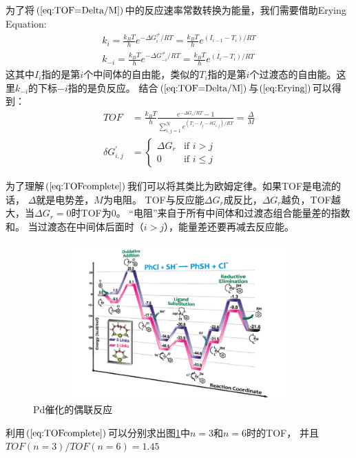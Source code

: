 \documentclass[a4paper,titlepage]{article}
\begin{document}
为了将$(\ref{eq:TOF=Delta/M})$中的反应速率常数转换为能量，我们需要借助Erying Equation:
\begin{equation}\label{eq:Erying}
\begin{split}
k_i = \frac{k_BT}{h}e^{-\Delta G_i^{\neq}/RT} = \frac{k_BT}{h}e^{(I_{i-1} - T_i)/RT}
\\
k_{-i} = \frac{k_BT}{h}e^{-\Delta G_{-i}^{\neq}/RT} = \frac{k_BT}{h}e^{(I_{i} - T_i)/RT}
\end{split}
\end{equation}
这其中$I_i$指的是第$i$个中间体的自由能，类似的$T_i$指的是第$i$个过渡态的自由能。这里$k_{-i}$的下标$-i$指的是负反应。
结合$(\ref{eq:TOF=Delta/M})$与$(\ref{eq:Erying})$可以得到：
\begin{equation}\label{eq:TOFcomplete}
\begin{split}
  TOF
  & =
  \frac{k_BT}{h}
  \frac{e^{-\Delta{G}_{r}/RT}-1}{\sum\limits_{i,j=1}^{N}e^{(T_i-I_j-\delta{}G_{i,j}^{'})/RT}}
  = \frac{\Delta{}}{M}
  \\
  \delta{}G_{i,j}^{'} & =
                  \begin{cases}
                  \Delta{G}_r & \text{if $i > j$}\\
                  0 & \text{if $i \leq j$}
                 \end{cases}
\end{split}
\end{equation}

为了理解$(\ref{eq:TOFcomplete})$我们可以将其类比为欧姆定律。如果TOF是电流的话，
$\Delta{}$就是电势差，$M$为电阻。
TOF与反应能$\Delta{G}_r$成反比，$\Delta{G}_r$越负，TOF越大，当$\Delta{G}_r=0$时TOF为0。
“电阻”来自于所有中间体和过渡态组合能量差的指数和。
当过渡态在中间体后面时（$i>j$），能量差还要再减去反应能。

\begin{figure}[h]
  \centering
  \includegraphics[width=12cm, height=6cm]{fig2}
  \caption{Pd催化的偶联反应}
  \label{fig:energies}
\end{figure}
利用$(\ref{eq:TOFcomplete})$可以分别求出图\ref{fig:energies}中$n=3$和$n=6$时的TOF，
并且$TOF(n=3)/TOF(n=6) = 1.45$
\end{document}
